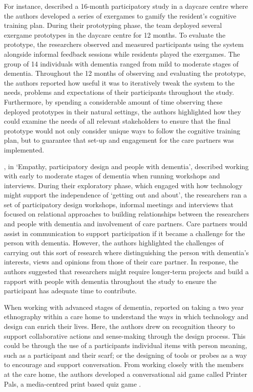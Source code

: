 For instance, \cite{unbehaun_facilitating_2018} described a 16-month participatory study in a daycare centre where the authors developed a series of exergames to gamify the resident's cognitive training plan. During their prototyping phase, the team deployed several exergame prototypes in the daycare centre for 12 months. To evaluate the prototype, the researchers observed and measured participants using the system alongside informal feedback sessions while residents played the exergames. The group of 14 individuals with dementia ranged from mild to moderate stages of dementia. Throughout the 12 months of observing and evaluating the prototype, the authors reported how useful it was to iteratively tweak the system to the needs, problems and expectations of their participants throughout the study. Furthermore, by spending a considerable amount of time observing these deployed prototypes in their natural settings, the authors highlighted how they could examine the needs of all relevant stakeholders to ensure that the final prototype would not only consider unique ways to follow the cognitive training plan, but to guarantee that set-up and engagement for the care partners was implemented. 

\cite{lindsay_empathy_2012}, in `Empathy, participatory design and people with dementia', described working with early to moderate stages of dementia when running workshops and interviews. During their exploratory phase, which engaged with how technology might support the independence of `getting out and about', the researchers ran a set of participatory design workshops, informal meetings and interviews that focused on relational approaches to building relationships between the researchers and people with dementia and involvement of care partners. Care partners would assist in communication to support participation if it became a challenge for the person with dementia. However, the authors highlighted the challenges of carrying out this sort of research where distinguishing the person with dementia's interests, views and opinions from those of their care partner. In response, the authors suggested that researchers might require longer-term projects and build a rapport with people with dementia throughout the study to ensure the participant has adequate time to contribute.

When working with advanced stages of dementia, \cite{foley_struggle_2019} reported on taking a two year ethnography within a care home to understand the ways in which technology and design can enrich their lives. Here, the authors drew on recognition theory to support collaborative actions and sense-making through the design process. This could be through the use of a participants individual items with person meaning, such as a participant and their scarf; or the designing of tools or probes as a way to encourage and support conversation. From working closely with the members at the care home, the authors developed a conversational aid game called Printer Pals, a media-centred print based quiz game \citep{foley_printer_2019}. 


